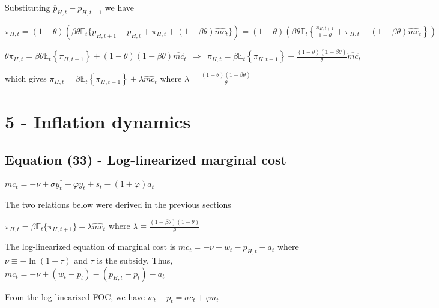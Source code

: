 \documentclass[
]{article}
\begin{document}
Substituting \(\overline{p}_{H,t}-p_{H,t-1}\) we have

\(\displaystyle \pi_{H,t}=(1-\theta)(\beta \theta \mathbb{E}_t \{ \overline{p}_{H,t+1}-p_{H,t} + \pi_{H,t}+(1-\beta \theta)\widehat{mc}_t\}) = (1-\theta) \left(\beta \theta \mathbb{E}_t \left\{ \frac{\pi_{H,t+1}}{1-\theta} + \pi_{H,t}+(1-\beta \theta)\widehat{mc}_t \right\} \right)\)

\(\displaystyle \theta \pi_{H,t} = \beta \theta \mathbb{E}_t \left\{ \pi_{H,t+1}\right\} +(1-\theta) (1-\beta \theta)\widehat{mc}_t \ \ \Rightarrow \ \  \pi_{H,t} = \beta \mathbb{E}_t \left\{ \pi_{H,t+1}\right\} +\frac{(1-\theta) (1-\beta \theta)}{\theta}\widehat{mc}_t\)

which gives
\(\pi_{H,t} = \beta \mathbb{E}_t \left\{ \pi_{H,t+1}\right\}+ \lambda\widehat{mc}_t\)
where
\(\displaystyle \lambda = \frac{(1-\theta) (1-\beta \theta)}{\theta}\)

\vspace{12pt}

\hypertarget{inflation-dynamics}{%
\section{5 - Inflation dynamics}\label{inflation-dynamics}}

\vspace{12pt}

\hypertarget{equation-33---log-linearized-marginal-cost}{%
\subsection{Equation (33) - Log-linearized marginal
cost}\label{equation-33---log-linearized-marginal-cost}}

\(\displaystyle mc_t =-\nu + \sigma y_t^*+ \varphi y_t+ s_t -(1+\varphi)a_t\)

\vspace{8pt}

The two relations below were derived in the previous sections

\(\pi_{H,t} = \beta \mathbb{E}_t \{ \pi_{H,t+1}\} + \lambda \widehat{mc}_t\)
where
\(\displaystyle \lambda \equiv \frac{(1-\beta \theta)(1-\theta)}{\theta}\)

The log-linearized equation of marginal cost is
\(mc_t = -\nu+w_t-p_{H,t}-a_t\) where \(\nu\equiv -\ln(1-\tau)\) and
\(\tau\) is the subsidy. Thus,
\(mc_t= -\nu + (w_t-p_t) - (p_{H,t}-p_t)-a_t\)

From the log-linearized FOC, we have
\(w_t-p_t=\sigma c_t + \varphi n_t\)
\end{document}
